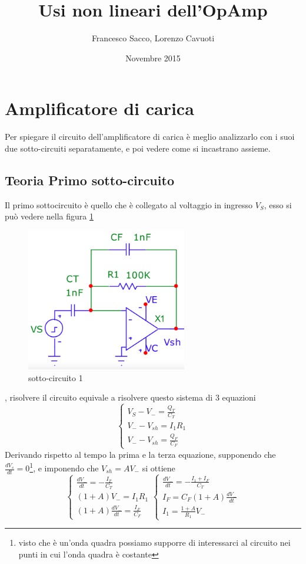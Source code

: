 \documentclass{article}
\date{Novembre 2015}
\author{Francesco Sacco, Lorenzo Cavuoti}
\title{Usi non lineari dell'OpAmp}
\begin{document}
	\maketitle
	\section{Amplificatore di carica}
		Per spiegare il circuito dell'amplificatore di carica è meglio analizzarlo con i suoi due sotto-circuiti separatamente, e poi vedere come si incastrano assieme.\newline
		\subsection{Teoria Primo sotto-circuito}
			Il primo sottocircuito è quello che è collegato al voltaggio in ingresso $V_S$, esso si può vedere nella figura \ref{fig:circ1}
			\begin{figure}
				\label{fig:circ1}
				\centering
				\includegraphics[width=70mm]{immagini/circ1a.png}
				\caption{sotto-circuito 1}
			\end{figure}
			, risolvere il circuito equivale a risolvere questo sistema di 3 equazioni
			\begin{equation}
				\begin{cases}
					V_S-V_-=\frac{Q_T}{C_T}\\
					V_--V_{sh}=I_1R_1\\
					V_--V_{sh}=\frac{Q_F}{C_F}
				\end{cases}
			\end{equation}
			Derivando rispetto al tempo la prima e la terza equazione, supponendo che $\frac{dV_s}{dt}=0$\footnote{visto che è un'onda quadra possiamo supporre di interessarci al circuito nei punti in cui l'onda quadra è costante}, e imponendo che $V_{sh}=AV_-$ si ottiene
			\[
				\begin{cases}
					\frac{dV_-}{dt}=-\frac{I_T}{C_T}\\
					(1+A)V_-=I_1R_1\\
					(1+A)\frac{dV_-}{dt}=\frac{I_F}{C_F}
				\end{cases}
				\begin{cases}
					\frac{dV_-}{dt}=-\frac{I_1+I_F}{C_T}\\
					I_F=C_F(1+A)\frac{dV_-}{dt}\\
					I_1=\frac{1+A}{R_1}V_-
				\end{cases}
			\]
\end{document}
